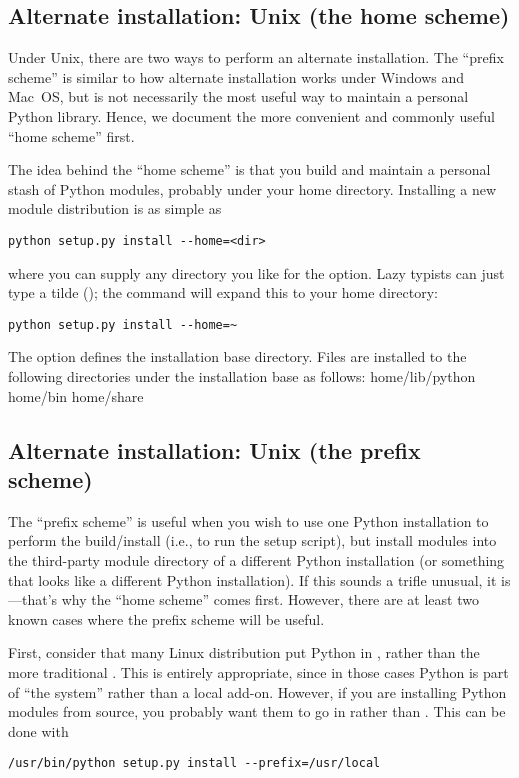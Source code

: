 \documentclass{howto}
\begin{document}
\subsection{Alternate installation: Unix (the home scheme)}
\label{sec:alt-unix-prefix}

Under Unix, there are two ways to perform an alternate installation.
The ``prefix scheme'' is similar to how alternate installation works
under Windows and Mac~OS, but is not necessarily the most useful way to
maintain a personal Python library.  Hence, we document the more
convenient and commonly useful ``home scheme'' first.

The idea behind the ``home scheme'' is that you build and maintain a
personal stash of Python modules, probably under your home directory.
Installing a new module distribution is as simple as
\begin{verbatim}
python setup.py install --home=<dir>
\end{verbatim}
where you can supply any directory you like for the 
option.  Lazy typists can just type a tilde (\code{\textasciitilde}); the
 command will expand this to your home directory:
\begin{verbatim}
python setup.py install --home=~
\end{verbatim}

The  option defines the installation base directory.  Files
are installed to the following directories under the installation base
as follows:
              {home}{/lib/python}
              {home}{/bin}
              {home}{/share}

\subsection{Alternate installation: Unix (the prefix scheme)}
\label{sec:alt-unix-home}

The ``prefix scheme'' is useful when you wish to use one Python
installation to perform the build/install (i.e., to run the setup
script), but install modules into the third-party module directory of a
different Python installation (or something that looks like a different
Python installation).  If this sounds a trifle unusual, it is---that's
why the ``home scheme'' comes first.  However, there are at least two
known cases where the prefix scheme will be useful.

First, consider that many Linux distribution put Python in ,
rather than the more traditional .  This is entirely
appropriate, since in those cases Python is part of ``the system''
rather than a local add-on.  However, if you are installing Python
modules from source, you probably want them to go in
 rather than
.  This can be done with
\begin{verbatim}
/usr/bin/python setup.py install --prefix=/usr/local
\end{verbatim}
\end{document}
